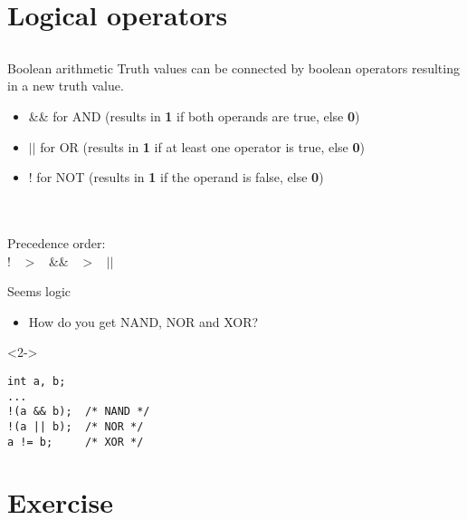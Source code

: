 \section{Logical operators}
\subsection{}
\begin{frame}{Boolean arithmetic}
	Truth values can be connected by boolean operators resulting in a new truth value.
	\begin{itemize}
		\item \&\& for AND (results in \textbf{1} if both operands are true, else \textbf{0})
		\item $||$ for OR (results in \textbf{1} if at least one operator is true, else \textbf{0})
		\item ! for NOT (results in \textbf{1} if the operand is false, else \textbf{0})
	\end{itemize}
	\ \\\ \\Precedence order:\\
	\centering
	! \ $>$ \ \&\& \ $>$ \ $||$ 
\end{frame}
\begin{frame}[fragile]{Seems logic}
	\begin{itemize}
		\item How do you get NAND, NOR and XOR?
	\end{itemize}
	\begin{uncoverenv}<2->
		\begin{lstlisting}[numbers=none]
int a, b;
...
!(a && b);	/* NAND */
!(a || b);	/* NOR */
a != b;		/* XOR */
\end{lstlisting}
	\end{uncoverenv}
\end{frame}
\section{Exercise}
